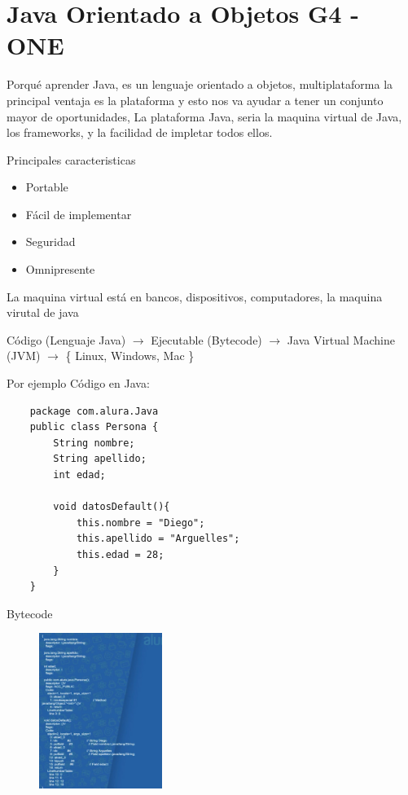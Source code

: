 \chapter{Java Orientado a Objetos G4 - ONE}
Porqu\'e aprender Java, es un lenguaje orientado a objetos, multiplataforma
la principal ventaja es la plataforma y esto nos va ayudar a tener un conjunto mayor de oportunidades,
La plataforma Java, seria la maquina virtual de Java, los frameworks, y la facilidad de impletar todos ellos.

Principales caracteristicas
\begin{itemize}
    \item Portable
    \item F\'acil de implementar
    \item Seguridad
    \item Omnipresente
\end{itemize}

La maquina virtual est\'a en bancos, dispositivos, computadores, la maquina virutal de java 

C\'odigo (Lenguaje Java) $\to$ Ejecutable (Bytecode) $\to$ Java Virtual Machine (JVM) $\to$ \{ Linux, Windows, Mac \}

Por ejemplo C\'odigo en Java: 
\begin{verbatim}
    package com.alura.Java
    public class Persona {
        String nombre;
        String apellido;
        int edad;

        void datosDefault(){
            this.nombre = "Diego";
            this.apellido = "Arguelles";
            this.edad = 28;
        }
    }
\end{verbatim}

Bytecode

\begin{figure}[h!]
    \center
    \begin{minipage}{5cm}
    \includegraphics[width=4cm]{Develop/Languages/Java/images/Captura desde 2023-02-07 23-21-16.png}
    \end{minipage}
  \end{figure}

